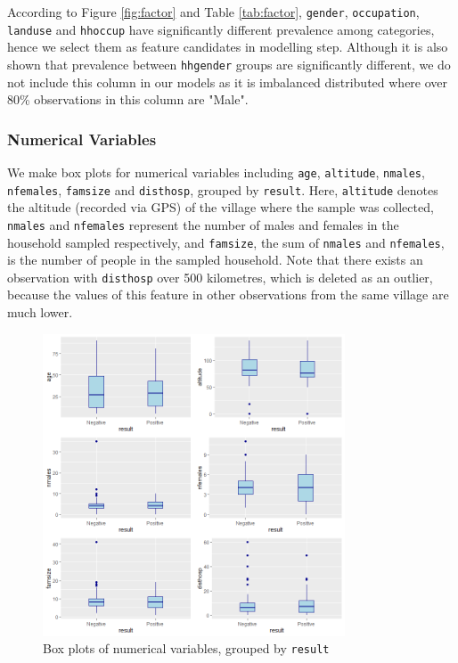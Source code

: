 \documentclass[11pt,twoside]{article}
\numberwithin{Theorem}{section}
\numberwithin{Definition}{section}
\numberwithin{Lemma}{section}
\numberwithin{Algorithm}{section}
\numberwithin{equation}{section}
\begin{document}
According to Figure \ref{fig:factor} and Table \ref{tab:factor}, \texttt{gender},  \texttt{occupation}, \texttt{landuse} and \texttt{hhoccup} have significantly different prevalence among categories, hence we select them as feature candidates in modelling step. Although it is also shown that prevalence between \texttt{hhgender} groups are significantly different, we do not include this column in our models as it is imbalanced distributed where over 80\% observations in this column are "Male".

\subsubsection{Numerical Variables}

We make box plots for numerical variables including \texttt{age}, \texttt{altitude}, \texttt{nmales}, \texttt{nfemales}, \texttt{famsize} and \texttt{disthosp}, grouped by \texttt{result}. Here, \texttt{altitude} denotes the altitude (recorded via GPS) of the village where the sample was collected, \texttt{nmales} and \texttt{nfemales} represent the number of males and females in the household sampled respectively, and \texttt{famsize}, the sum of \texttt{nmales} and \texttt{nfemales}, is the number of people in the sampled household. Note that there exists an observation with \texttt{disthosp} over 500 kilometres, which is deleted as an outlier, because the values of this feature in other observations from the same village are much lower.

\begin{figure}[!h]
	\centering
	\includegraphics[width = 0.8\textwidth]{Images/numerical.png}
	\caption{Box plots of numerical variables, grouped by \texttt{result}}
	\label{fig:numerical}
\end{figure}
\end{document}

